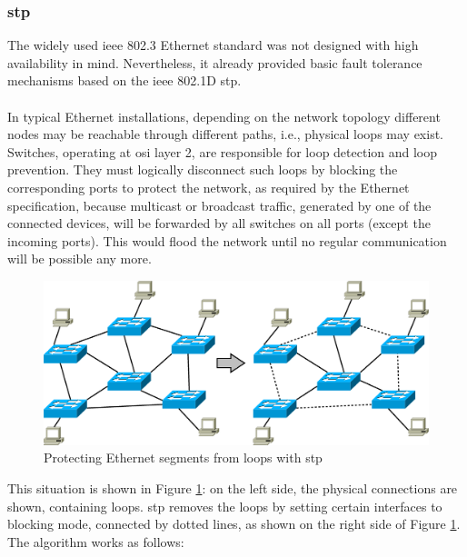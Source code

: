 \subsubsection{\gls{stp}}
The widely used \gls{ieee} 802.3 Ethernet standard was not designed with high availability in mind.
Nevertheless, it already provided basic fault tolerance mechanisms based on the \gls{ieee} 802.1D \gls{stp}. 
\\
\\
In typical Ethernet installations, depending on the network topology different
nodes may be reachable through different paths, i.e., physical loops may exist.
Switches, operating at \gls{osi} layer 2, are responsible for loop detection and
loop prevention. They must logically disconnect such loops by blocking the corresponding ports to protect the network,
as required by the Ethernet specification, because multicast or broadcast traffic, generated by one of the connected
devices, will be forwarded by all switches on all ports (except the incoming ports). This would flood the network until no regular communication will be possible any
more.
\\
\begin{figure}[H]
 \includegraphics[width=\linewidth]{figures/stp.eps}
 \caption{Protecting Ethernet segments from loops with \gls{stp}}
\label{fig:stp1}
\end{figure}
This situation is shown in Figure \ref{fig:stp1}: on the left side, the physical connections are shown, containing loops. 
\gls{stp} removes
the loops by setting certain interfaces to blocking mode, connected by dotted lines, as shown on the right side of Figure \ref{fig:stp1}.
\\
The algorithm works as follows:

